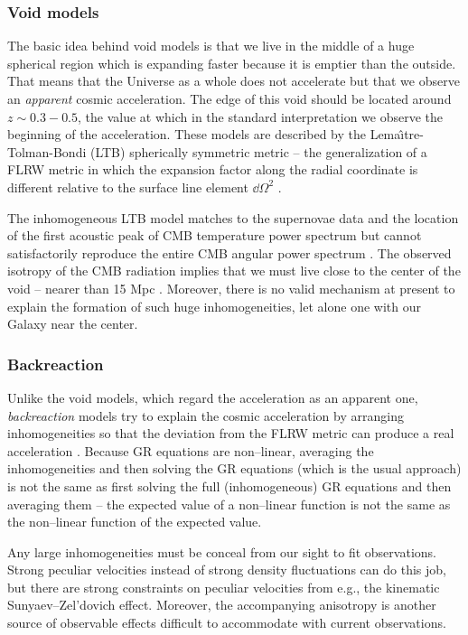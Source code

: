 \subsubsection{Void models}
The basic idea behind void models is that we live in the middle of a huge spherical region which is expanding faster because it is emptier than the outside. That means that the Universe as a whole does not accelerate but that we observe an \textit{apparent} cosmic acceleration. The edge of this void should be located around $z\sim0.3-0.5$, the value at which in the standard interpretation we observe the beginning of the acceleration. These models are described by the Lema\^\i tre-Tolman-Bondi (LTB) spherically symmetric metric -- the generalization of a FLRW metric in which the expansion factor along the radial coordinate is different relative to the surface line element $\dd\Omega^2$ \parencite{2013JCAP...02..047D,2006PhRvD..73h3519A}.

The inhomogeneous LTB model matches to the supernovae data and the location of the first acoustic peak of CMB temperature power spectrum but cannot satisfactorily reproduce the entire CMB angular power spectrum \parencite{2011JCAP...02..013C}. The observed isotropy of the CMB radiation implies that we must live close to the center of the void -- nearer than 15 Mpc \parencite{2006PhRvD..74j3520A}. Moreover, there is no valid mechanism at present to explain the formation of such huge inhomogeneities, let alone one with our Galaxy near the center.
\subsubsection{Backreaction}
Unlike the void models, which regard the acceleration as an apparent one, \textit{backreaction} models try to explain the cosmic acceleration by arranging inhomogeneities so that the deviation from the FLRW metric can produce a real acceleration \parencite{2011CQGra..28w5002S,2004JCAP...02..003R,2005PhRvD..72b3507M}. Because GR equations are non--linear, averaging the inhomogeneities and then solving the GR equations (which is the usual approach) is not the same as first solving the full (inhomogeneous) GR equations and then averaging them -- the expected value of a non--linear function is not the same as the non--linear function of the expected value.

Any large inhomogeneities must be conceal from our sight to fit observations. Strong peculiar velocities instead of strong density fluctuations can do this job, but there are strong constraints on peculiar velocities from e.g., the kinematic Sunyaev--Zel'dovich effect. Moreover, the accompanying anisotropy is another source of observable effects difficult to accommodate with current observations.

